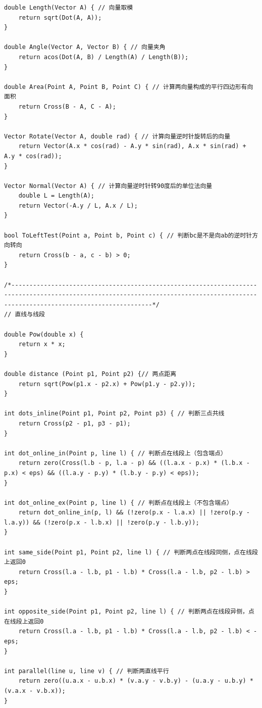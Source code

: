 \documentclass[twoside]{article}
\begin{document}
\begin{lstlisting}
double Length(Vector A) { // 向量取模
    return sqrt(Dot(A, A));
}

double Angle(Vector A, Vector B) { // 向量夹角
    return acos(Dot(A, B) / Length(A) / Length(B));
}

double Area(Point A, Point B, Point C) { // 计算两向量构成的平行四边形有向面积
    return Cross(B - A, C - A);
}

Vector Rotate(Vector A, double rad) { // 计算向量逆时针旋转后的向量
    return Vector(A.x * cos(rad) - A.y * sin(rad), A.x * sin(rad) + A.y * cos(rad)); 
}

Vector Normal(Vector A) { // 计算向量逆时针转90度后的单位法向量
    double L = Length(A);
    return Vector(-A.y / L, A.x / L);
}

bool ToLeftTest(Point a, Point b, Point c) { // 判断bc是不是向ab的逆时针方向转向
    return Cross(b - a, c - b) > 0;
}

/*-----------------------------------------------------------------------------------------------------------------------------------------------------------------------------------*/
// 直线与线段

double Pow(double x) {
    return x * x;
}

double distance (Point p1, Point p2) {// 两点距离
    return sqrt(Pow(p1.x - p2.x) + Pow(p1.y - p2.y));
}

int dots_inline(Point p1, Point p2, Point p3) { // 判断三点共线
    return Cross(p2 - p1, p3 - p1);
}

int dot_online_in(Point p, line l) { // 判断点在线段上（包含端点）
    return zero(Cross(l.b - p, l.a - p) && ((l.a.x - p.x) * (l.b.x - p.x) < eps) && ((l.a.y - p.y) * (l.b.y - p.y) < eps));
}

int dot_online_ex(Point p, line l) { // 判断点在线段上（不包含端点）
    return dot_online_in(p, l) && (!zero(p.x - l.a.x) || !zero(p.y - l.a.y)) && (!zero(p.x - l.b.x) || !zero(p.y - l.b.y));
}

int same_side(Point p1, Point p2, line l) { // 判断两点在线段同侧，点在线段上返回0
    return Cross(l.a - l.b, p1 - l.b) * Cross(l.a - l.b, p2 - l.b) > eps;
}

int opposite_side(Point p1, Point p2, line l) { // 判断两点在线段异侧，点在线段上返回0
    return Cross(l.a - l.b, p1 - l.b) * Cross(l.a - l.b, p2 - l.b) < -eps;
}

int parallel(line u, line v) { // 判断两直线平行
    return zero((u.a.x - u.b.x) * (v.a.y - v.b.y) - (u.a.y - u.b.y) * (v.a.x - v.b.x));
}


\end{lstlisting}
\end{document}
